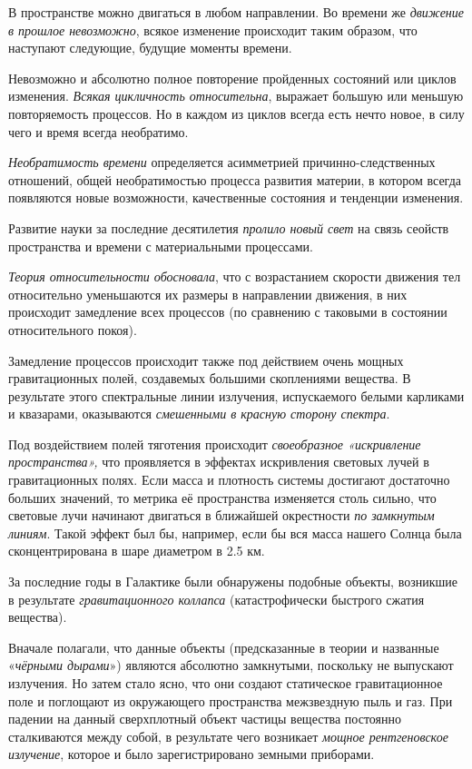 \documentclass[a4paper,14pt,russian]{extreport}
\begin{document}
В пространстве можно двигаться в любом направлении. Во времени же \emph{движение в прошлое невозможно}, всякое изменение происходит таким образом, что наступают следующие, будущие моменты времени.

Невозможно и абсолютно полное повторение пройденных состояний или циклов изменения. \emph{Всякая цикличность относительна}, выражает большую или меньшую повторяемость процессов. Но в каждом из циклов всегда есть нечто новое, в силу чего и время всегда необратимо.

\emph{Необратимость времени} определяется асимметрией причинно-следственных отношений, общей необратимостью процесса развития материи, в котором всегда появляются новые возможности, качественные состояния и тенденции изменения.

Развитие науки за последние десятилетия \emph{пролило новый свет} на связь сеойств пространства и времени с материальными процессами.

\emph{Теория относительности обосновала}, что с возрастанием скорости движения тел относительно уменьшаются их размеры в направлении движения, в них происходит замедление всех процессов (по сравнению с таковыми в состоянии относительного покоя).

Замедление процессов происходит также под действием очень мощных гравитационных полей, создавемых большими скоплениями вещества. В результате этого спектральные линии излучения, испускаемого белыми карликами и квазарами, оказываются \emph{смешенными в красную сторону спектра}.

Под воздействием полей тяготения происходит \emph{своеобразное «искривление пространства»,} что проявляется в эффектах искривления световых лучей в гравитационных полях. Если масса и плотность системы достигают достаточно больших значений, то метрика её пространства изменяется столь сильно, что световые лучи начинают двигаться в ближайшей окрестности \emph{по замкнутым линиям}. Такой эффект был бы, например, если бы вся масса нашего Солнца была сконцентрирована в шаре диаметром в 2.5 км.

За последние годы в Галактике были обнаружены подобные объекты, возникшие в результате \emph{гравитационного коллапса} (катастрофически быстрого сжатия вещества).

Вначале полагали, что данные объекты (предсказанные в теории и названные «\emph{чёрными дырами}») являются абсолютно замкнутыми, поскольку не выпускают излучения. Но затем стало ясно, что они создают статическое гравитационное поле и поглощают из окружающего пространства межзвездную пыль и газ. При падении на данный сверхплотный объект частицы вещества постоянно сталкиваются между собой, в результате чего возникает \emph{мощное рентгеновское излучение}, которое и было зарегистрировано земными приборами.
\end{document}
